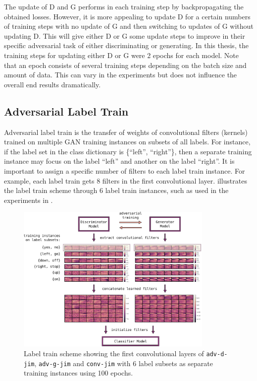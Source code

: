 The update of D and G performs in each training step by backpropagating the obtained losses.
However, it is more appealing to update D for a certain numbers of training steps with no update of G and then switching to updates of G without updating D.
This will give either D or G some update steps to improve in their specific adversarial task of either discriminating or generating.
In this thesis, the training steps for updating either D or G were 2 epochs for each model.
Note that an epoch consists of several training steps depending on the batch size and amount of data.
This can vary in the experiments but does not influence the overall end results dramatically.



\subsection{Adversarial Label Train}
Adversarial label train is the transfer of weights of convolutional filters (kernels) trained on multiple GAN training instances on subsets of all labels.
For instance, if the label set in the class dictionary is \{\enquote{left}, \enquote{right}\}, then a separate training instance may focus on the label \enquote{left} and another on the label \enquote{right}.
It is important to assign a specific number of filters to each label train instance.
For example, each label train gets 8 filters in the first convolutional layer.
 illustrates the label train scheme through 6 label train instances, such as used in the experiments in .
\begin{figure}[!ht]
  \centering
    \includegraphics[width=0.85\textwidth]{./4_nn/figs/nn_adv_label_scheme.pdf}
  \caption{Label train scheme showing the first convolutional layers of \texttt{adv-d-jim}, \texttt{adv-g-jim} and \texttt{conv-jim} with 6 label subsets as separate training instances using 100 epochs.}
  \label{fig:nn_adv_label_scheme}
\end{figure}
